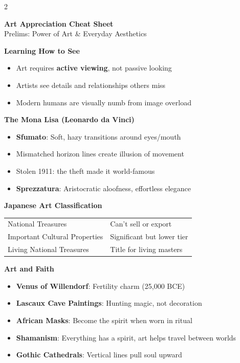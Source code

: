 \documentclass[11pt,letterpaper]{article}
\newcommand{\mysection}[1]{%
    \vspace{-0.3em}
    \colorbox{sectioncolor}{\makebox[\linewidth][l]{\bfseries\color{white}#1}}%
    \vspace{0.3em}
}
\newcommand{\mysubsection}[1]{%
    \vspace{-0.2em}
    {\bfseries\color{sectioncolor}#1}%
    \vspace{0.1em}
}
\begin{document}
\raggedright
\footnotesize
\begin{multicols*}{2}

\begin{center}
     \Large{\textbf{\color{sectioncolor}Art Appreciation Cheat Sheet}} \\
     \small{Prelims: Power of Art \& Everyday Aesthetics}
\end{center}

\mysection{Part 1: The Power of Art}

\mysubsection{Learning How to See}
\begin{itemize}[leftmargin=*, noitemsep, topsep=0pt]
    \item Art requires \textbf{active viewing}, not passive looking
    \item Artists see details and relationships others miss
    \item Modern humans are visually numb from image overload
\end{itemize}

\mysubsection{The Mona Lisa (Leonardo da Vinci)}
\begin{itemize}[leftmargin=*, noitemsep, topsep=0pt]
    \item \textbf{Sfumato}: Soft, hazy transitions around eyes/mouth
    \item Mismatched horizon lines create illusion of movement
    \item Stolen 1911: the theft made it world-famous
    \item \textbf{Sprezzatura}: Aristocratic aloofness, effortless elegance
\end{itemize}

\mysubsection{Japanese Art Classification}
\begin{tabular}{l|l}
    National Treasures & Can't sell or export \\
    Important Cultural Properties & Significant but lower tier \\
    Living National Treasures & Title for living masters \\
\end{tabular}

\mysubsection{Art and Faith}
\begin{itemize}[leftmargin=*, noitemsep, topsep=0pt]
    \item \textbf{Venus of Willendorf}: Fertility charm (25,000 BCE)
    \item \textbf{Lascaux Cave Paintings}: Hunting magic, not decoration
    \item \textbf{African Masks}: Become the spirit when worn in ritual
    \item \textbf{Shamanism}: Everything has a spirit, art helps travel between worlds
    \item \textbf{Gothic Cathedrals}: Vertical lines pull soul upward
\end{itemize}


\end{multicols*}
\end{document}
